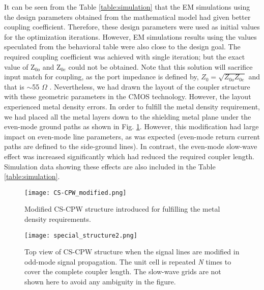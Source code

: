 \documentclass[journal]{IEEEtran}
\begin{document}
It can be seen from the Table \ref{table:simulation} that the EM simulations using the design parameters obtained from the mathematical model had given better coupling coefficient. Therefore, these design parameters were used as initial values for the optimization iterations. However, EM simulations results using the values speculated from the behavioral table were also close to the design goal. The required coupling coefficient was achieved with single iteration; but the exact value of Z$_{0o}$ and Z$_{0e}$ could not be obtained. Note that this solution will sacrifice input match for coupling, as the port impedance is defined by,  $Z_{0} = \sqrt{Z_{0o}Z_{0e}}$ and that is $\sim$55 $\Omega$ . Nevertheless, we had drawn the layout of the coupler structure with these geometric parameters in the CMOS technology. However, the layout experienced metal density errors. In order to fulfill the metal density requirement, we had placed all the metal layers down to the shielding metal plane under the even-mode ground paths as shown in Fig. \ref{GCPW}. However, this modification had large impact on even-mode line parameters, as was expected (even-mode return current paths are defined to the side-ground lines). In contrast, the even-mode slow-wave effect was increased significantly which had reduced the required coupler length. Simulation data showing these effects are also included in the Table \ref{table:simulation}.

\begin{figure}
	\texttt{[image: CS-CPW\_modified.png]}
	\caption{Modified CS-CPW structure introduced for fulfilling the metal density requirements.}
	\label{GCPW}
\end{figure}

\begin{figure}
	\texttt{[image: special\_structure2.png]}
	\caption{Top view of CS-CPW structure when the signal lines are modified in odd-mode signal propagation. The unit cell is repeated \textit{N} times to cover the complete coupler length. The slow-wave grids are not shown here to avoid any ambiguity in the figure.}
	\label{special_structure}
\end{figure}
\end{document}
